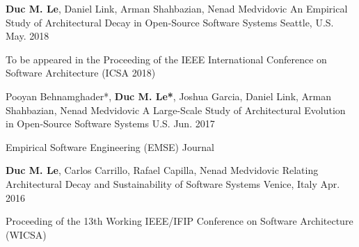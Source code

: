 \vspace{-1mm}

\begin{cventries}


\cventry
{\textbf{Duc M. Le}, Daniel	Link, Arman	Shahbazian, Nenad Medvidovic} %
{An Empirical Study of Architectural Decay in Open-Source Software Systems} %
{Seattle, U.S.} %
{May. 2018} %
{
	\begin{cvitems} %
		\item To be appeared in the Proceeding of the IEEE International Conference on Software Architecture (ICSA 2018)
	\end{cvitems}
}

  \cventry
    {Pooyan Behnamghader*, \textbf{Duc M. Le*}, Joshua Garcia, Daniel	Link, Arman	Shahbazian, Nenad Medvidovic} %
    {A Large-Scale Study of Architectural Evolution in Open-Source Software Systems} %
    {U.S. } %
    {Jun. 2017} %
    {
      \begin{cvitems} %
        \item Empirical Software Engineering (EMSE) Journal 
      \end{cvitems}
    }
    

	
\cventry
{\textbf{Duc M. Le}, Carlos Carrillo, Rafael Capilla, Nenad Medvidovic} %
{Relating Architectural Decay and Sustainability of Software Systems} %
{Venice, Italy} %
{Apr. 2016} %
{
	\begin{cvitems} %
		\item Proceeding of the 13th Working IEEE/IFIP Conference on Software Architecture (WICSA)
	\end{cvitems}
}



\end{cventries}
